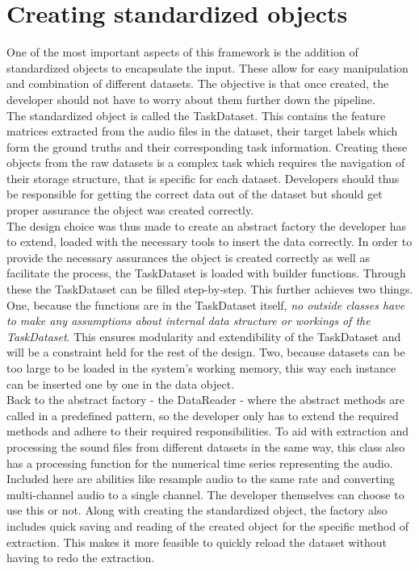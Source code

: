 \section{Creating standardized objects} \label{Design:StandardizedObjects}

One of the most important aspects of this framework is the addition of standardized objects to encapsulate the input. These allow for easy manipulation and combination of different datasets. The objective is that once created, the developer should not have to worry about them further down the pipeline. \\


The standardized object is called the TaskDataset. This contains the feature matrices extracted from the audio files in the dataset, their target labels which form the ground truths and their corresponding task information. Creating these objects from the raw datasets is a complex task which requires the navigation of their storage structure, that is specific for each dataset. Developers should thus be responsible for getting the correct data out of the dataset but should get proper assurance the object was created correctly. \\

The design choice was thus made to create an abstract factory the developer has to extend, loaded with the necessary tools to insert the data correctly. In order to provide the necessary assurances the object is created correctly as well as facilitate the process, the TaskDataset is loaded with builder functions. Through these the TaskDataset can be filled step-by-step. This further achieves two things. One, because the functions are in the TaskDataset itself, \textit{no outside classes have to make any assumptions about internal data structure or workings of the TaskDataset}. This ensures modularity and extendibility of the TaskDataset and will be a constraint held for the rest of the design. Two, because datasets can be too large to be loaded in the system's working memory, this way each instance can be inserted one by one in the data object. \\

Back to the abstract factory - the DataReader - where the abstract methods are called in a predefined pattern, so the developer only has to extend the required methods and adhere to their required responsibilities. To aid with extraction and processing the sound files from different datasets in the same way, this class also has a processing function for the numerical time series representing the audio. Included here are abilities like resample audio to the same rate and converting multi-channel audio to a single channel. The developer themselves can choose to use this or not. Along with creating the standardized object, the factory also includes quick saving and reading of the created object for the specific method of extraction. This makes it more feasible to quickly reload the dataset without having to redo the extraction. \\

